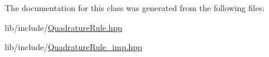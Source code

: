 The documentation for this class was generated from the following files\-:\begin{DoxyCompactItemize}
\item 
lib/include/\hyperlink{QuadratureRule_8hpp}{Quadrature\-Rule.\-hpp}\item 
lib/include/\hyperlink{QuadratureRule__imp_8hpp}{Quadrature\-Rule\-\_\-imp.\-hpp}\end{DoxyCompactItemize}
